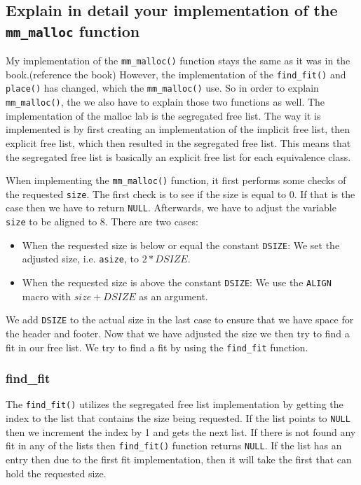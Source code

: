 \documentclass[11pt]{article}
\newcommand{\code}[1]{{\colorbox{lightgray!15}{\color{orange}\texttt{#1}}}}
\newcommand{\temp}[1]{{\color{red}#1}}
\begin{document}
\subsection{Explain in detail your implementation of the \code{mm\_malloc} function}

My implementation of the \code{mm\_malloc()} function stays the same as it was in the book.\temp{(reference the book)}
However, the implementation of the \code{find\_fit()} and \code{place()} has changed, which the \code{mm\_malloc()} use. So in order to explain \code{mm\_malloc()},
the we also have to explain those two functions as well.
The implementation of the malloc lab is the segregated free list. 
The way it is implemented is by first creating an implementation of the implicit free list, then explicit free list, 
which then resulted in the segregated free list.
This means that the segregated free list is basically an explicit free list for each equivalence class.

When implementing the \code{mm\_malloc()} function, it first performs some checks of the requested \code{size}. The first check is to see if the size is equal to 0. If that is the case then we have to return \code{NULL}.
Afterwards, we have to adjust the variable \code{size} to be aligned to 8. There are two cases:
\begin{itemize}
    \item When the requested size is below or equal the constant \code{DSIZE}: We set the adjusted size, i.e. \code{asize}, to $2 * DSIZE$.
    \item When the requested size is above the constant \code{DSIZE}: We use the \code{ALIGN} macro with $size + DSIZE$ as an argument.
\end{itemize}

We add \code{DSIZE} to the actual size in the last case to ensure that we have space for the header and footer.
Now that we have adjusted the size we then try to find a fit in our free list. 
We try to find a fit by using the \code{find\_fit} function.

\subsubsection{find\_fit}
The \code{find\_fit()} utilizes the segregated free list implementation by getting the index to the list that contains the size being requested. 
If the list points to \code{NULL} then we increment the index by 1 and gets the next list. 
If there is not found any fit in any of the lists then \code{find\_fit()} function returns \code{NULL}.
If the list has an entry then due to the first fit implementation, then it will take the first that can hold the requested size.
\end{document}
